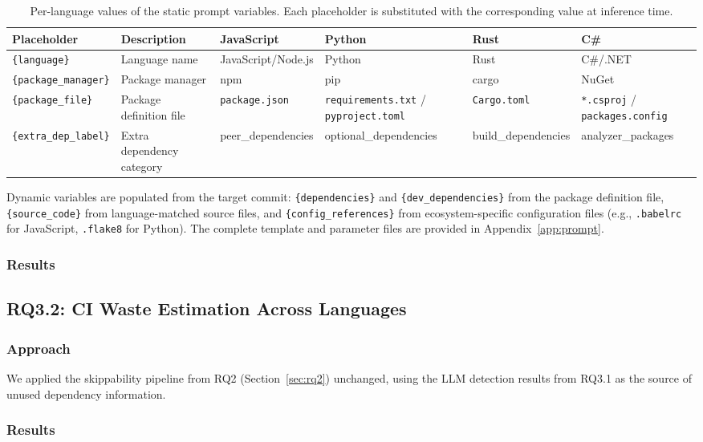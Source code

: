 \begin{table}[t]
  \centering
  \caption{Per-language values of the static prompt variables.
           Each placeholder is substituted with the corresponding value
           at inference time.}
  \label{tab:prompt-static-vars}
  \small
  \begin{tabular}{llllll}
    \toprule
    Placeholder & Description & JavaScript & Python & Rust & C\# \\
    \midrule
    \texttt{\{language\}} & Language name
      & JavaScript/Node.js & Python & Rust & C\#/.NET \\
    \texttt{\{package\_manager\}} & Package manager
      & npm & pip & cargo & NuGet \\
    \texttt{\{package\_file\}} & Package definition file
      & \texttt{package.json}
      & \texttt{requirements.txt} / \texttt{pyproject.toml}
      & \texttt{Cargo.toml}
      & \texttt{*.csproj} / \texttt{packages.config} \\
    \texttt{\{extra\_dep\_label\}} & Extra dependency category
      & peer\_dependencies & optional\_dependencies & build\_dependencies & analyzer\_packages \\
    \bottomrule
  \end{tabular}
\end{table}

Dynamic variables are populated from the target commit: \texttt{\{dependencies\}}
and \texttt{\{dev\_dependencies\}} from the package definition file,
\texttt{\{source\_code\}} from language-matched source files,
and \texttt{\{config\_references\}} from ecosystem-specific configuration files
(e.g., \texttt{.babelrc} for JavaScript, \texttt{.flake8} for Python).
The complete template and parameter files are provided in
Appendix~\ref{app:prompt}.

\subsubsection{Results}

\subsection{RQ3.2: CI Waste Estimation Across Languages}
\label{sec:rq3.2}

\subsubsection{Approach}
We applied the skippability pipeline from RQ2 (Section~\ref{sec:rq2})
unchanged, using the LLM detection results from RQ3.1 as the source of unused
dependency information.

\subsubsection{Results}
